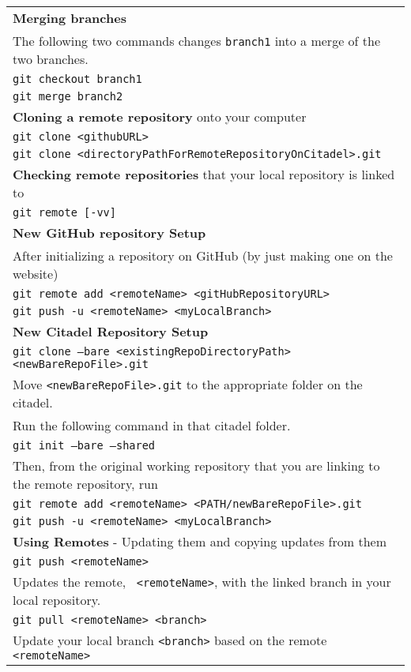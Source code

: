 \documentclass[11pt]{article}
\newcommand{\smallbold}[1]{\footnotesize\textbf{#1}}
\begin{document}
{\begin{center}
\begin{tabular}{|l|}
\hline
\smallbold{Merging branches}\\  The following two commands changes \texttt{branch1} into a merge of the two branches. \\
\quad \texttt{git checkout branch1}\\
\quad \texttt{git merge branch2}\\

\hline
\smallbold{Cloning a remote repository} onto your computer\\
\quad \texttt{git clone <githubURL>}\\

\quad \texttt{git clone <directoryPathForRemoteRepositoryOnCitadel>.git}\\

\hline
\smallbold{Checking remote repositories} that your local repository is linked to\\
\quad \texttt{git remote [-vv]}\\

\hline
\smallbold{New GitHub repository Setup}\\
After initializing a repository on GitHub (by just making one on the website)\\
\quad \texttt{git remote add <remoteName> <gitHubRepositoryURL>}\\
\quad \texttt{git push -u <remoteName> <myLocalBranch>}\\
\hline
\smallbold{New Citadel Repository Setup}\\
\quad \texttt{git clone --bare <existingRepoDirectoryPath> <newBareRepoFile>.git}\\
Move \texttt{<newBareRepoFile>.git} to the appropriate folder on the citadel.\\  
Run the following command in that citadel folder.\\
\quad \texttt{git init --bare --shared}\\
Then, from the original working repository that you are linking to the remote repository, run\\
\quad \texttt{git remote add <remoteName> <PATH/newBareRepoFile>.git}\\
\quad \texttt{git push -u <remoteName> <myLocalBranch>}\\

\hline
\smallbold{Using Remotes} - Updating them and copying updates from them\\
\quad \texttt{git push <remoteName>}\\
\quad\quad Updates the remote, \texttt{ <remoteName>}, with the linked branch in your local repository.\\
\quad \texttt{git pull <remoteName> <branch>}\\
\quad \quad Update your local branch \texttt{<branch>} based on the remote \texttt{<remoteName>}\\


\end{tabular}
\end{center}}
\end{document}
